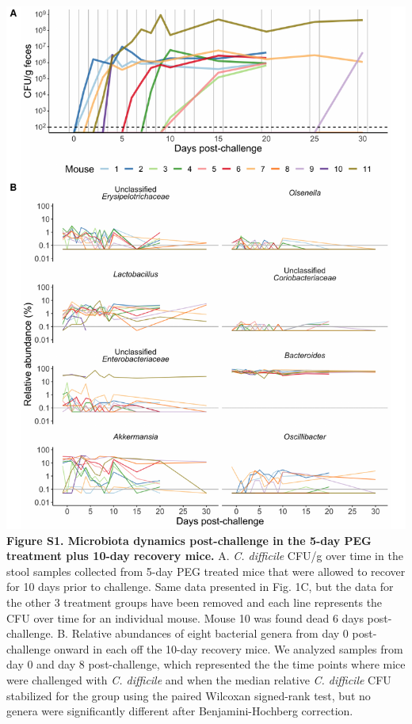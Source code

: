\documentclass[
  11pt,
]{article}
\begin{document}
\includegraphics{figure_S1.pdf} \textbf{Figure S1. Microbiota dynamics
post-challenge in the 5-day PEG treatment plus 10-day recovery mice.} A.
\emph{C. difficile} CFU/g over time in the stool samples collected from
5-day PEG treated mice that were allowed to recover for 10 days prior to
challenge. Same data presented in Fig. 1C, but the data for the other 3
treatment groups have been removed and each line represents the CFU over
time for an individual mouse. Mouse 10 was found dead 6 days
post-challenge. B. Relative abundances of eight bacterial genera from
day 0 post-challenge onward in each off the 10-day recovery mice. We
analyzed samples from day 0 and day 8 post-challenge, which represented
the the time points where mice were challenged with \emph{C. difficile}
and when the median relative \emph{C. difficile} CFU stabilized for the
group using the paired Wilcoxan signed-rank test, but no genera were
significantly different after Benjamini-Hochberg correction. \newpage
\end{document}
